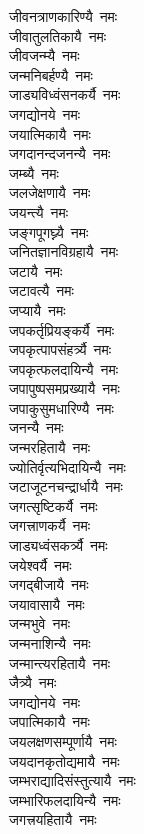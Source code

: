 \begin{flushleft}
\begin{multicols}{2}
जीवनत्राणकारिण्यै~नमः\\
जीवातुलतिकायै~नमः\\
जीवजन्म्यै~नमः\\
जन्मनिबर्हण्यै~नमः\\
जाड्यविध्वंसनकर्यै~नमः\\
जगद्योनये~नमः\\
जयात्मिकायै~नमः\\
जगदानन्दजनन्यै~नमः\hfill{}\\
जम्ब्यै~नमः\\
जलजेक्षणायै~नमः\\
जयन्त्यै~नमः\\
जङ्गपूगघ्न्यै~नमः\\
जनितज्ञानविग्रहायै~नमः\\
जटायै~नमः\\
जटावत्यै~नमः\\
जप्यायै~नमः\\
जपकर्तृप्रियङ्कर्यै~नमः\\
जपकृत्पापसंहर्त्र्यै~नमः\hfill{}\\
जपकृत्फलदायिन्यै~नमः\\
जपापुष्पसमप्रख्यायै~नमः\\
जपाकुसुमधारिण्यै~नमः\\
जनन्यै~नमः\\
जन्मरहितायै~नमः\\
ज्योतिर्वृत्यभिदायिन्यै~नमः\\
जटाजूटनचन्द्रार्धायै~नमः\\
जगत्सृष्टिकर्यै~नमः\\
जगत्त्राणकर्यै~नमः\\
जाड्यध्वंसकर्त्र्यै~नमः\hfill{}\\
जयेश्वर्यै~नमः\\
जगद्बीजायै~नमः\\
जयावासायै~नमः\\
जन्मभुवे~नमः\\
जन्मनाशिन्यै~नमः\\
जन्मान्त्यरहितायै~नमः\\
जैत्र्यै~नमः\\
जगद्योनये~नमः\\
जपात्मिकायै~नमः\\
जयलक्षणसम्पूर्णायै~नमः\hfill{}\\
जयदानकृतोद्यमायै~नमः\\
जम्भराद्यादिसंस्तुत्यायै~नमः\\
जम्भारिफलदायिन्यै~नमः\\
जगत्त्रयहितायै~नमः\\

\end{multicols}
\end{flushleft}
